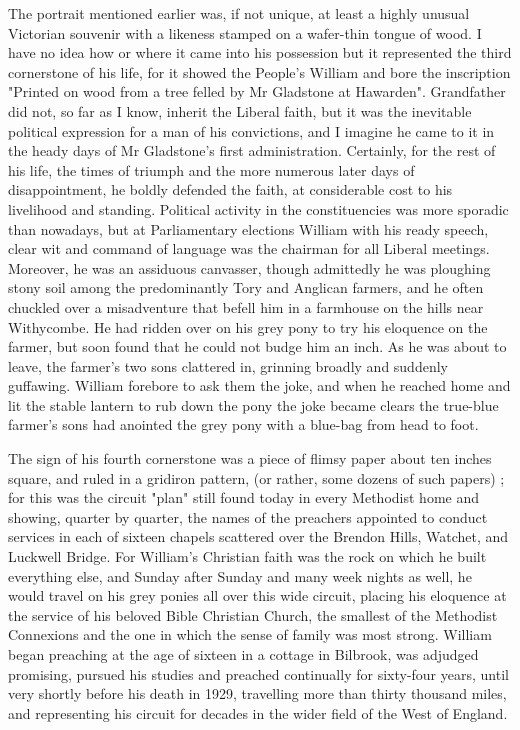 The portrait mentioned earlier was, if not unique, at least a highly unusual Victorian souvenir with a likeness stamped on a wafer-thin tongue of wood. I have no idea how or where it came into his possession but it represented the third cornerstone of his life, for it showed the People's William and bore the inscription "Printed on wood from a tree felled by Mr Gladstone at Hawarden". Grandfather did not, so far as I know, inherit the Liberal faith, but it was the inevitable political expression for a man of his convictions, and I imagine he came to it in the heady days of Mr Gladstone's first administration. Certainly, for the rest of his life, the times of triumph and the more numerous later days of disappointment, he boldly defended the faith, at considerable cost to his livelihood and standing. Political activity in the constituencies was more sporadic than nowadays, but at Parliamentary elections William with his ready speech, clear wit and command of language was the chairman for all Liberal meetings. Moreover, he was an assiduous canvasser, though admittedly he was ploughing stony soil among the predominantly Tory and Anglican farmers, and he often chuckled over a misadventure that befell him in a farmhouse on the hills near Withycombe. He had ridden over on his grey pony to try his eloquence on the farmer, but soon found that he could not budge him an inch. As he was about to leave, the farmer's two sons clattered in, grinning broadly and suddenly guffawing. William forebore to ask them the joke, and when he reached home and lit the stable lantern to rub down the pony the joke became clears the true-blue farmer's sons had anointed the grey pony with a blue-bag from head to foot.

The sign of his fourth cornerstone was a piece of flimsy paper about ten inches square, and ruled in a gridiron pattern, (or rather, some dozens of such papers) ; for this was the circuit "plan" still found today in every Methodist home and showing, quarter by quarter, the names of the preachers appointed to conduct services in each of sixteen chapels scattered over the Brendon Hills, Watchet, and Luckwell Bridge. For William's Christian faith was the rock on which he built everything else, and Sunday after Sunday and many week nights as well, he would travel on his grey ponies all over this wide circuit, placing his eloquence at the service of his beloved Bible Christian Church, the smallest of the Methodist Connexions and the one in which the sense of family was most strong. William began preaching at the age of sixteen in a cottage in Bilbrook, was adjudged promising, pursued his studies and preached continually for sixty-four years, until very shortly before his death in 1929, travelling more than thirty thousand miles, and representing his circuit for decades in the wider field of the West of England.

